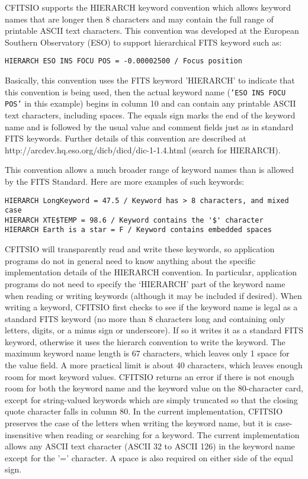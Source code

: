 \documentclass[11pt]{book}
\begin{document}
CFITSIO supports the HIERARCH keyword convention which allows keyword
names that are longer then 8 characters and may contain the full range
of printable ASCII text characters.  This convention
was developed at the European Southern Observatory (ESO)  to support
hierarchical FITS keyword such as:

\begin{verbatim}
HIERARCH ESO INS FOCU POS = -0.00002500 / Focus position
\end{verbatim}
Basically, this convention uses the FITS keyword 'HIERARCH' to indicate
that this convention is being used, then the actual keyword name
({\tt'ESO INS FOCU POS'} in this example) begins in column 10 and can
contain any printable ASCII text characters, including spaces.  The
equals sign marks the end of the keyword name and is followed by the
usual value and comment fields just as in standard FITS keywords.
Further details of this convention are described at
http://arcdev.hq.eso.org/dicb/dicd/dic-1-1.4.html (search for
HIERARCH).

This convention allows a much broader range of keyword names
than is allowed by the FITS Standard.  Here are more examples
of such keywords:

\begin{verbatim}
HIERARCH LongKeyword = 47.5 / Keyword has > 8 characters, and mixed case
HIERARCH XTE$TEMP = 98.6 / Keyword contains the '$' character
HIERARCH Earth is a star = F / Keyword contains embedded spaces
\end{verbatim}
CFITSIO will transparently read and write these keywords, so application
programs do not in general need to know anything about the specific
implementation details of the HIERARCH convention.  In particular,
application programs do not need to specify the `HIERARCH' part of the
keyword name when reading or writing keywords (although it
may be included if desired).  When writing a keyword, CFITSIO first
checks to see if the keyword name is legal as a standard FITS keyword
(no more than 8 characters long and containing only letters, digits, or
a minus sign or underscore). If so it writes it as a standard FITS
keyword, otherwise it uses the hierarch convention to write the
keyword.   The maximum keyword name length is 67 characters, which
leaves only 1 space for the value field.  A more practical limit is
about 40 characters, which leaves enough room for most keyword values.
CFITSIO returns an error if there is not enough room for both the
keyword name and the keyword value on the 80-character card, except for
string-valued keywords which are simply truncated so that the closing
quote character falls in column 80.  In the current implementation,
CFITSIO preserves the case of the letters when writing the keyword
name, but it is case-insensitive when reading or searching for a
keyword.  The current implementation allows any ASCII text character
(ASCII 32 to ASCII 126) in the keyword name except for the '='
character.  A space is also required on either side of the equal sign.
\end{document}
